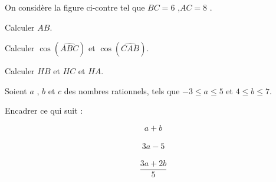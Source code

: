 \documentclass[a4paper,addpoints,12pt]{exam}
\begin{document}
\devoir[sem=2,prv=false,ds=true,num=5 ,niv=2 ,date=08/05/2023]

\begin{exo}[8]
\begin{minipage}{.65\linewidth}
On considère la figure ci-contre tel que $BC=6$ ,$AC=8$ .
\begin{questions}
\question[2] Calculer  $AB$.

\anserline[4]
\end{questions}
\end{minipage}
\begin{minipage}{.35\linewidth}
\end{minipage}
\begin{questions}
\setcounter{question}{1}
\question[3] Calculer $\cos(\widehat{ABC})$ et $\cos(\widehat{CAB})$.
\begin{multicols}{2}
\anserline[2]
\columnbreak

\anserline[2]
\end{multicols}
\question[3] Calculer $HB$ et $HC$ et $HA$.
\begin{multicols}{3}
\anserline[3]
\columnbreak

\anserline[3]
\columnbreak

\anserline[3]
\end{multicols}
\end{questions}
\end{exo}

\begin{exo}[6]
Soient $a$ , $b$ et $c$ des nombres rationnels, tels que $-3\leq a \leq 5$ et $4\leq b \leq 7$.
\begin{questions}
\question[6] Encadrer ce qui suit :\vspace{-1cm}
\begin{multicols}{3}
\[a+b\]\\ \anserline[3]
\[3a-5\]\\ \anserline[3]
\[\frac{3a+2b}{5}\]\\ \anserline[3]
\end{multicols}
\end{questions}
\end{exo}
\end{document}
